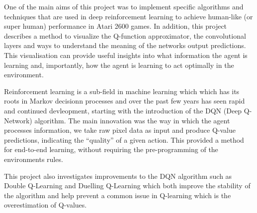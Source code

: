 One of the main aims of this project was to implement specific algorithms and techniques that are used in deep reinforcement learning to achieve human-like (or super human) performance in Atari 2600 games. In addition, this project describes a method to visualize the Q-function approximator, the convolutional layers and ways to understand the meaning of the networks output predictions. This visualisation can provide useful insights into what information the agent is learning and, importantly, how the agent is learning to act optimally in the environment.

Reinforcement learning is a sub-field in machine learning which which has its roots in Markov decisionn processes and over the past few years has seen rapid and continued devleopment, starting with the introduction of the DQN (Deep Q-Network) algorithm. The main innovation was the way in which the agent processes information, we take raw pixel data as input and produce Q-value predictions, indicating the ``quality'' of a given action. This provided a method for end-to-end learning, without requiring the pre-programming of the environments rules.

This project also investigates improvements to the DQN algorithm such as Double Q-Learning and Duelling Q-Learning which both improve the stability of the algorithm and help prevent a common issue in Q-learning which is the overestimation of Q-values.